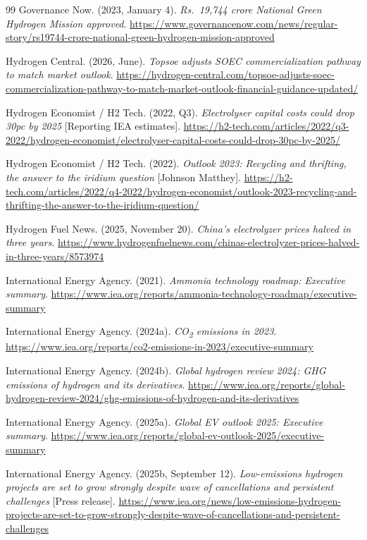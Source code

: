 {\begin{thebibliography}{99}
 Governance Now. (2023, January 4). \emph{Rs.\ 19,744 crore National Green Hydrogen Mission approved}. \url{https://www.governancenow.com/news/regular-story/rs19744-crore-national-green-hydrogen-mission-approved}

 Hydrogen Central. (2026, June). \emph{Topsoe adjusts SOEC commercialization pathway to match market outlook}. \url{https://hydrogen-central.com/topsoe-adjusts-soec-commercialization-pathway-to-match-market-outlook-financial-guidance-updated/}

 Hydrogen Economist / H2 Tech. (2022, Q3). \emph{Electrolyser capital costs could drop 30pc by 2025} [Reporting IEA estimates]. \url{https://h2-tech.com/articles/2022/q3-2022/hydrogen-economist/electrolyser-capital-costs-could-drop-30pc-by-2025/}

 Hydrogen Economist / H2 Tech. (2022). \emph{Outlook 2023: Recycling and thrifting, the answer to the iridium question} [Johnson Matthey]. \url{https://h2-tech.com/articles/2022/q4-2022/hydrogen-economist/outlook-2023-recycling-and-thrifting-the-answer-to-the-iridium-question/}

 Hydrogen Fuel News. (2025, November 20). \emph{China's electrolyzer prices halved in three years}. \url{https://www.hydrogenfuelnews.com/chinas-electrolyzer-prices-halved-in-three-years/8573974}

 International Energy Agency. (2021). \emph{Ammonia technology roadmap: Executive summary}. \url{https://www.iea.org/reports/ammonia-technology-roadmap/executive-summary}

 International Energy Agency. (2024a). \emph{CO\textsubscript{2} emissions in 2023}. \url{https://www.iea.org/reports/co2-emissions-in-2023/executive-summary}

 International Energy Agency. (2024b). \emph{Global hydrogen review 2024: GHG emissions of hydrogen and its derivatives}. \url{https://www.iea.org/reports/global-hydrogen-review-2024/ghg-emissions-of-hydrogen-and-its-derivatives}

 International Energy Agency. (2025a). \emph{Global EV outlook 2025: Executive summary}. \url{https://www.iea.org/reports/global-ev-outlook-2025/executive-summary}

 International Energy Agency. (2025b, September 12). \emph{Low-emissions hydrogen projects are set to grow strongly despite wave of cancellations and persistent challenges} [Press release]. \url{https://www.iea.org/news/low-emissions-hydrogen-projects-are-set-to-grow-strongly-despite-wave-of-cancellations-and-persistent-challenges}


\end{thebibliography}}
